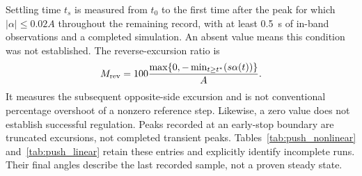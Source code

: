 Settling time $t_s$ is measured from $t_0$ to the first time after the peak for which $|\alpha|\le0.02A$ throughout the remaining record, with at least 0.5~s of in-band observations and a completed simulation. An absent value means this condition was not established. The reverse-excursion ratio is
\[
M_{\rm rev}=100\frac{\max\{0,-\min_{t\ge t^*}(s\alpha(t))\}}{A}.
\]
It measures the subsequent opposite-side excursion and is not conventional percentage overshoot of a nonzero reference step. Likewise, a zero value does not establish successful regulation. Peaks recorded at an early-stop boundary are truncated excursions, not completed transient peaks. Tables~\ref{tab:push_nonlinear} and~\ref{tab:push_linear} retain these entries and explicitly identify incomplete runs. Their final angles describe the last recorded sample, not a proven steady state.

